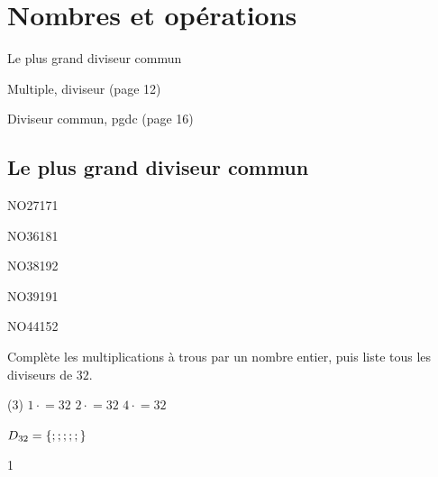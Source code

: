 \documentclass[a4paper,12pt]{report}
\begin{document}
\newcommand{\chapterName}{Nombres et opérations}
\newcommand{\serieName}{Le plus grand diviseur commun}


\chapter*{\chapterName}
\thispagestyle{empty}

\begin{amL}{\serieName}{
\item Multiple, diviseur (page 12)
\item Diviseur commun, pgdc (page 16)
}\end{amL}

\section*{\serieName}
\setcounter{page}{1}
\thispagestyle{firstPage}





\begin{exol}{NO27}{17}{1}
\end{exol}

\begin{exol}{NO36}{18}{1}
\end{exol}

\begin{exol}{NO38}{19}{2}
\end{exol}

\begin{exol}{NO39}{19}{1}
\end{exol}

\begin{exof}{NO44}{15}{2}
\end{exof}




\begin{exop}{
    Complète les multiplications à trous par un nombre entier, puis liste tous les diviseurs de $32$. 
    \begin{tasks}(3)
	    \task[] $1\cdot$\hrulefill$=32$
	    \task[] $2\cdot$\hrulefill$=32$
	    \task[] $4\cdot$\hrulefill$=32$
    \end{tasks}

$D_{32}=\{\hrulefill;\hrulefill;\hrulefill;\hrulefill;\hrulefill;\hrulefill\}$
}{1}\end{exop}
\end{document}
